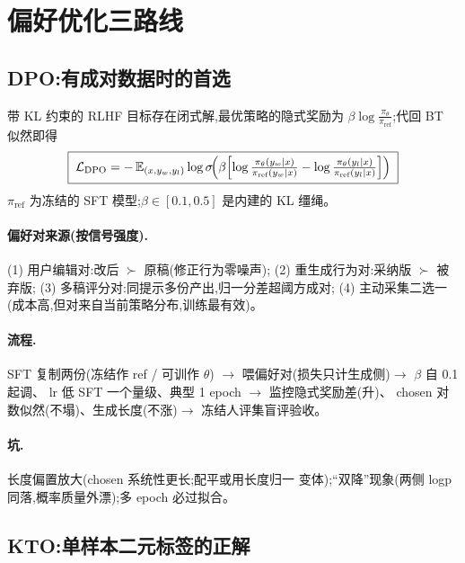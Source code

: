 \documentclass[UTF8, 11pt]{ctexart}
\begin{document}
\section{偏好优化三路线}

\subsection{DPO:有成对数据时的首选}

带 KL 约束的 RLHF 目标存在闭式解,最优策略的隐式奖励为
$\beta\log\frac{\pi_\theta}{\pi_{\text{ref}}}$;代回 BT 似然即得
\begin{equation}
\boxed{\;
\mathcal{L}_{\text{DPO}}
=-\,\mathbb{E}_{(x,y_w,y_l)}\log\sigma\!\Bigl(
\beta\Bigl[\log\tfrac{\pi_\theta(y_w\mid x)}{\pi_{\text{ref}}(y_w\mid x)}
-\log\tfrac{\pi_\theta(y_l\mid x)}{\pi_{\text{ref}}(y_l\mid x)}\Bigr]\Bigr)\;}
\label{eq:dpo}
\end{equation}
$\pi_{\text{ref}}$ 为冻结的 SFT 模型;$\beta\in[0.1,0.5]$ 是内建的 KL 缰绳。

\paragraph{偏好对来源(按信号强度).}
(1) 用户编辑对:改后 $\succ$ 原稿(修正行为零噪声);
(2) 重生成行为对:采纳版 $\succ$ 被弃版;
(3) 多稿评分对:同提示多份产出,归一分差超阈方成对;
(4) 主动采集二选一(成本高,但对来自当前策略分布,训练最有效)。

\paragraph{流程.} SFT 复制两份(冻结作 ref / 可训作 $\theta$)
$\to$ 喂偏好对(损失只计生成侧)$\to$ $\beta$ 自 0.1 起调、
lr 低 SFT 一个量级、典型 1 epoch $\to$ 监控隐式奖励差(升)、
chosen 对数似然(不塌)、生成长度(不涨)$\to$ 冻结人评集盲评验收。

\paragraph{坑.} 长度偏置放大(chosen 系统性更长;配平或用长度归一
变体);``双降''现象(两侧 logp 同落,概率质量外漂);多 epoch 必过拟合。

\subsection{KTO:单样本二元标签的正解}
\end{document}
